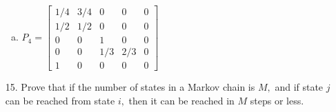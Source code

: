 \documentclass{article}
\begin{document}
\begin{itemize}
\begin{enumerate}[(a)]
			\item $P_4=\begin{bmatrix}
					1/4 & 3/4 & 0 & 0 & 0 \\
					1/2 & 1/2 & 0 & 0 & 0 \\
					0 & 0 & 1 & 0 & 0 \\
					0 & 0 & 1/3 & 2/3 & 0 \\
					1 & 0 & 0 & 0 & 0
				\end{bmatrix}$
				
		\end{enumerate}
		
	\item[15.] Prove that if the number of states in a Markov chain is $M,$ and if state $j$ can be reached from state $i,$ then it can be reached in $M$ steps or less.
		
\end{itemize}
\end{document}

